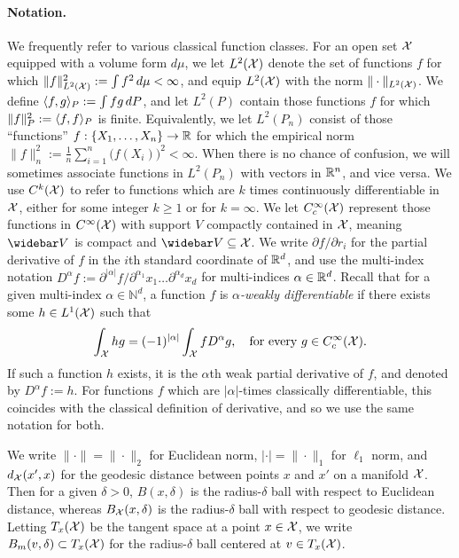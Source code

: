 \paragraph{Notation.}
We frequently refer to various classical function classes. For an open set $\mathcal{X}$ equipped with a volume form $d\mu$, we let $L^2(\mathcal{X})$ denote the set of functions $f$ for which $\|f\|_{L^2(\mathcal{X})}^2 := \int f^2 \,d\mu  < \infty$, and equip $L^2(\mathcal{X})$ with the norm $\|\cdot\|_{L^2(\mathcal{X})}$. We define $\langle f, g \rangle_P := \int fg\,dP$, and let $L^2(P)$ contain those functions $f$ for which $\|f\|_P^2 := \langle f, f \rangle_P$ is finite. Equivalently, we let $L^2(P_n)$ consist of those ``functions'' $f: \{X_1,\ldots,X_n\} \to \mathbb{R}$ for which the empirical norm $\|f\|_{n}^2 := \frac{1}{n}\sum_{i = 1}^{n} \bigl(f(X_i)\bigr)^2 < \infty$. When there is no chance of confusion, we will sometimes associate functions in $L^2(P_n)$ with vectors in $\mathbb{R}^n$, and vice versa. We use $C^k(\mathcal{X})$ to refer to functions which are $k$ times continuously differentiable in $\mathcal{X}$, either for some integer $k \geq 1$ or for $k = \infty$. We let $C_c^{\infty}(\mathcal{X})$ represent those functions in $C^{\infty}(\mathcal{X})$ with support $V$ compactly contained in $\mathcal{X}$, meaning $\wb{V}$ is compact and $\wb{V} \subseteq \mc{X}$. We write $\partial f/\partial r_i$ for the partial derivative of $f$ in the $i$th standard coordinate of $\mathbb{R}^d$, and use the multi-index notation $D^{\alpha}f := \partial^{|\alpha|}f/\partial^{\alpha_1}x_1\ldots\partial^{\alpha_d}x_d$ for multi-indices $\alpha \in \mathbb{R}^d$. Recall that for a given multi-index $\alpha \in \mathbb{N}^d$, a function $f$ is \emph{$\alpha$-weakly differentiable} if there exists some $h \in L^1(\mathcal{X})$ such that
\begin{equation*}
\int_{\mathcal{X}} h g = (-1)^{|\alpha|} \int_{\mathcal{X}} f D^{\alpha}g, \quad \textrm{for every $g \in C_c^{\infty}(\mathcal{X})$.}
\end{equation*}
If such a function $h$ exists, it is the $\alpha$th weak partial derivative of $f$, and denoted by $D^{\alpha}f := h$. For functions $f$ which are $|\alpha|$-times classically differentiable, this coincides with the classical definition of derivative, and so we use the same notation for both.

We write $\|\cdot\| = \|\cdot\|_2$ for Euclidean norm, $|\cdot| = \|\cdot\|_1$ for $\ell_1$ norm, and $d_{\mathcal{X}}(x',x)$ for the geodesic distance between points $x$ and $x'$ on a manifold $\mathcal{X}$. Then for a given $\delta > 0$, $B(x,\delta)$ is the radius-$\delta$ ball with respect to Euclidean distance, whereas $B_{\mathcal{X}}(x,\delta)$ is the radius-$\delta$ ball with respect to geodesic distance. Letting $T_x(\mathcal{X})$ be the tangent space at a point $x \in \mathcal{X}$, we write $B_m(v,\delta) \subset T_x(\mathcal{X})$ for the radius-$\delta$ ball centered at $v \in T_x(\mathcal{X})$.

